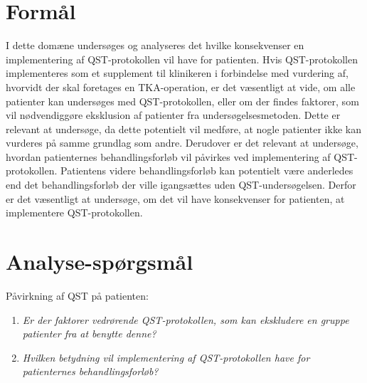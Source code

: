 \section{Formål}
I dette domæne undersøges og analyseres det hvilke konsekvenser en implementering af QST-protokollen vil have for patienten. Hvis QST-protokollen implementeres som et supplement til klinikeren i forbindelse med vurdering af, hvorvidt der skal foretages en TKA-operation, er det væsentligt at vide, om alle patienter kan undersøges med QST-protokollen, eller om der findes faktorer, som vil nødvendiggøre eksklusion af patienter fra undersøgelsesmetoden. Dette er relevant at undersøge, da dette potentielt vil medføre, at nogle patienter ikke kan vurderes på samme grundlag som andre. Derudover er det relevant at undersøge, hvordan patienternes behandlingsforløb vil påvirkes ved implementering af QST-protokollen. Patientens videre behandlingsforløb kan potentielt være anderledes end det behandlingsforløb der ville igangsættes uden QST-undersøgelsen. Derfor er det væsentligt at undersøge, om det vil have konsekvenser for patienten, at implementere QST-protokollen.
 
\section{Analyse-spørgsmål}
Påvirkning af QST på patienten: 
\begin{enumerate}
\item \textit{Er der faktorer vedrørende QST-protokollen, som kan ekskludere en gruppe patienter fra at benytte denne?} %
\item \textit{Hvilken betydning vil implementering af QST-protokollen have for patienternes behandlingsforløb?} %
\end{enumerate}

